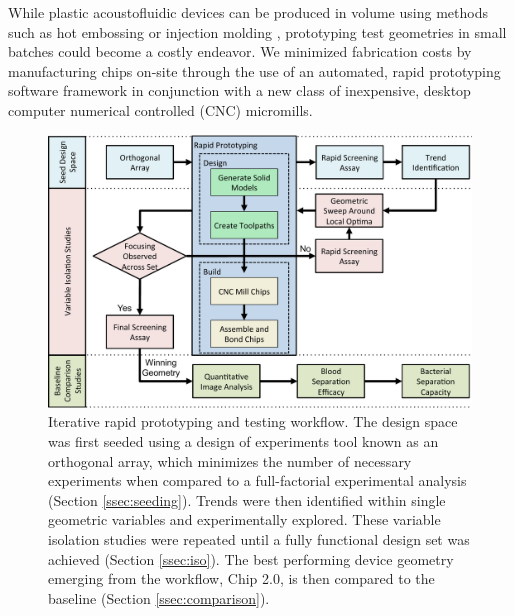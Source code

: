 While plastic acoustofluidic devices can be produced in volume using methods such as hot embossing or injection molding \cite{heckele2003review}, prototyping test geometries in small batches could become a costly endeavor.  We minimized fabrication costs by manufacturing chips on-site through the use of an automated, rapid prototyping software framework in conjunction with a new class of inexpensive, desktop computer numerical controlled (CNC) micromills.



\begin{figure}[htb]
  \begin{minipage}[t]{0.99\linewidth}\centering
    \includegraphics[width=14cm]{flow.pdf}
  \end{minipage}\hfill
  \caption[Rapid prototyping workflow]{Iterative rapid prototyping and testing workflow. The design space was first seeded using a design of experiments tool known as an orthogonal array, which minimizes the number of necessary experiments when compared to a full-factorial experimental analysis (Section \ref{ssec:seeding}). Trends were then identified within single geometric variables and experimentally explored. These variable isolation studies were repeated until a fully functional design set was achieved (Section \ref{ssec:iso}). The best performing device geometry emerging from the workflow, Chip 2.0, is then compared to the baseline (Section \ref{ssec:comparison}).}
\label{fig:flow}       %
\end{figure}

